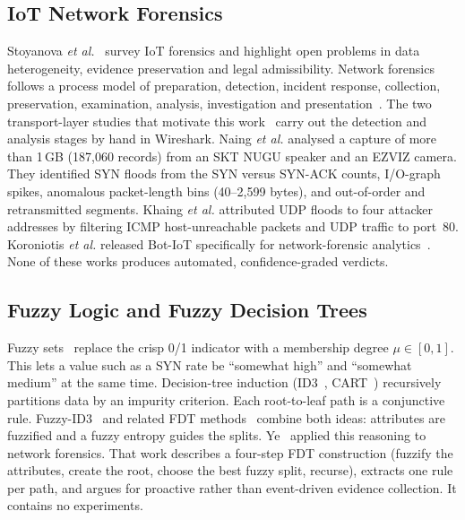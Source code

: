 \documentclass[conference]{IEEEtran}
\begin{document}
\subsection{IoT Network Forensics}
Stoyanova \emph{et al.}~\cite{stoyanova2020} survey IoT forensics and highlight open problems in data heterogeneity, evidence preservation and legal admissibility. Network forensics follows a process model of preparation, detection, incident response, collection, preservation, examination, analysis, investigation and presentation~\cite{naing2023}. The two transport-layer studies that motivate this work~\cite{naing2023,khaing2020} carry out the detection and analysis stages by hand in Wireshark. Naing \emph{et al.} analysed a capture of more than 1\,GB (187,060 records) from an SKT NUGU speaker and an EZVIZ camera. They identified SYN floods from the SYN versus SYN-ACK counts, I/O-graph spikes, anomalous packet-length bins (40--2,599 bytes), and out-of-order and retransmitted segments. Khaing \emph{et al.} attributed UDP floods to four attacker addresses by filtering ICMP host-unreachable packets and UDP traffic to port~80. Koroniotis \emph{et al.} released Bot-IoT specifically for network-forensic analytics~\cite{koroniotis2019}. None of these works produces automated, confidence-graded verdicts.

\subsection{Fuzzy Logic and Fuzzy Decision Trees}
Fuzzy sets~\cite{zadeh1965} replace the crisp 0/1 indicator with a membership degree $\mu\in[0,1]$. This lets a value such as a SYN rate be ``somewhat high'' and ``somewhat medium'' at the same time. Decision-tree induction (ID3~\cite{quinlan1986}, CART~\cite{breiman1984}) recursively partitions data by an impurity criterion. Each root-to-leaf path is a conjunctive rule. Fuzzy-ID3~\cite{yuan1995} and related FDT methods~\cite{janikow1998} combine both ideas: attributes are fuzzified and a fuzzy entropy guides the splits. Ye~\cite{ye2022} applied this reasoning to network forensics. That work describes a four-step FDT construction (fuzzify the attributes, create the root, choose the best fuzzy split, recurse), extracts one rule per path, and argues for proactive rather than event-driven evidence collection. It contains no experiments.
\end{document}
